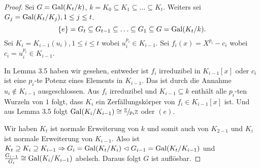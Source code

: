 \begin{proof}
	Sei $G = \operatorname{Gal}(K_{t} /k)$, $k = K_0 \subseteq K_1 \subseteq \ldots \subseteq K_{t}$. Weiters sei $G_{j} = \operatorname{Gal}(K_{t} / K_{j}) , 1 \leq j \leq t$.
	\[
		\{e\}  = G_{t} \subseteq G_{t-1} \subseteq \ldots \subseteq G_1 \subseteq G = \operatorname{Gal}(K_{t} /k)
	.\]
	Sei $K_{i} = K_{i-1}(u_{i}), 1 \leq i \leq t$ wobei $u_{i}^{p_{i}} \in K_{i-1}$.
	Sei $f_{i}(x) = X^{p_{i}}- c_{i}$ wobei $c_{i} = u_{i}^{p_{i}} \in K_{i-1}$.

	In Lemma 3.5 haben wir gesehen, entweder ist $f_{i}$ irreduzibel in  $K_{i-1}[x]$ oder  $c_{i}$ ist eine $p_{i}$-te Potenz eines Elements in $K_{i-1}$.
	Das ist durch die Annahme $u_{i} \not\in K_{i-1}$ ausgeschlossen. Aus $f_{i}$ irreduzibel und $K_{i-1} \subseteq k$ enthält alle $p_{i}$-ten Wurzeln von $1$ folgt,
	dass $K_{i}$ ein Zerfällungskörper von $f_{i} \in K_{i-1}[x]$ ist. Und aus Lemma 3.5 folgt $\operatorname{Gal}(K_{i} / K_{i-1}) \cong \sfrac{\mathbb{Z}}{p_{i} \mathbb{Z}}$ oder $(e)$.

	Wir haben $K_{t}$ ist normale Erweiterung von $k$ und somit auch von $K_{2-1}$ und $K_{i}$ ist normale Erweiterung von $K_{i-1}$.
	Also ist $K_{t} \supseteq K_{i} \supseteq K_{i-1} \Rightarrow G_{i} = \operatorname{Gal}(K_{t} /K_{i}) \vartriangleleft G_{i-1} = \operatorname{Gal}(K_{t} / K_{i-1})$ 
	und $\frac{G_{i-1}}{G_{i}} \cong \operatorname{Gal}(K_{i} / K_{i-1})$ abelsch.
	Daraus folgt $G$ ist auflösbar.
\end{proof}

